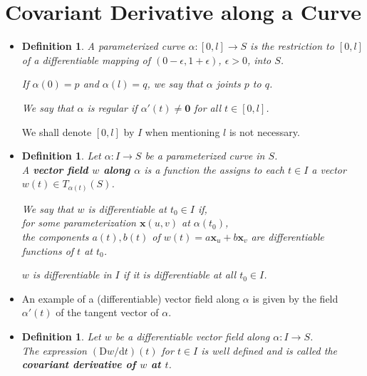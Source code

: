 \documentclass[10pt]{article}
\newtheorem{definition}[lemma]{Definition}
\newcommand{\dee}{\mathrm{d}}
\newcommand{\Dee}{\mathrm{D}}
\newcommand{\ve}[1]{\mathbf{#1}}
\newcommand{\ra}{\rightarrow}
\begin{document}
  \section{Covariant Derivative along a Curve}
  \begin{itemize}
    \item \begin{definition}
      A parameterized curve $\alpha : [0, l] \ra S$ is the restriction to $[0,l]$ of a differentiable mapping of $(0-\epsilon, 1+\epsilon)$, $\epsilon > 0$, into $S$.

      If $\alpha(0) = p$ and $\alpha(l) = q$, we say that $\alpha$ joints $p$ to $q$.

      We say that $\alpha$ is regular if $\alpha'(t) \neq \ve{0}$ for all $t \in [0, l]$.      
    \end{definition}

    We shall denote $[0,l]$ by $I$ when mentioning $l$ is not necessary.

    \item \begin{definition}
      Let $\alpha : I \ra S$ be a parameterized curve in $S$.\\
      A {\bf vector field $w$ along $\alpha$} is a function the assigns to each $t \in I$ a vector $w(t) \in T_{\alpha(t)}(S)$.

      We say that $w$ is differentiable at $t_0 \in I$ if,\\
      for some parameterization $\ve{x}(u,v)$ at $\alpha(t_0)$,\\
      the components $a(t), b(t)$ of $w(t) = a \ve{x}_u + b \ve{x}_v$ are differentiable functions of $t$ at $t_0$.

      $w$ is differentiable in $I$ if it is differentiable at all $t_0 \in I$.
    \end{definition} 

    \item An example of a (differentiable) vector field along $\alpha$ is given by the field $\alpha'(t)$ of the tangent vector of $\alpha$.

    \item \begin{definition}
      Let $w$ be a differentiable vector field along $\alpha : I \ra S$.\\
      The expression $(\Dee w / \dee t)(t)$ for $t \in I$ is well defined and is called the {\bf covariant derivative of $w$ at $t$}.
    \end{definition}


\end{itemize}
\end{document}
